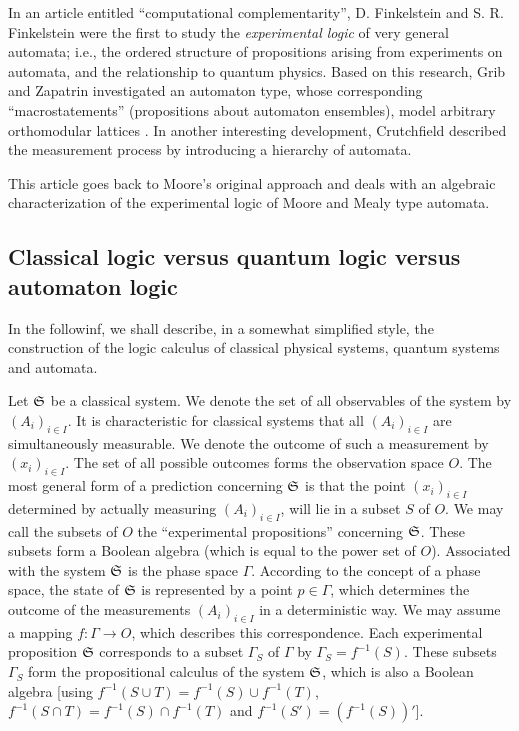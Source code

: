 In an article entitled ``computational complementarity'',
D. Finkelstein and S. R. Finkelstein \cite{finkelstein} were the first
to study the {\em experimental logic} of very general
automata; i.e., the ordered structure of propositions
arising from experiments on automata, and the relationship to quantum
physics. Based on this research, Grib and Zapatrin \cite{grib90,grib92}
investigated an
automaton type, whose corresponding ``macrostatements'' (propositions
about automaton ensembles),  model
arbitrary orthomodular lattices \cite{gsz}. In another interesting
development, Crutchfield
\cite{crutchfield}
described the measurement process by
introducing a hierarchy of automata.

This article goes back to Moore's original approach and deals with
an algebraic characterization of the experimental logic of Moore and
Mealy type automata.

\subsection{Classical logic versus quantum logic versus automaton logic}

In the followinf, we shall describe, in a somewhat simplified
style, the construction of the logic calculus
of classical physical systems, quantum systems and automata.

Let ${\frak S}$ be a classical system.
We denote the set of all observables of the system by
$(A_i)_{i \in I}$.
It is characteristic for classical systems that all $(A_i)_{i \in I}$ are
simultaneously measurable.
We denote the outcome of such a measurement by $(x_i)_{i \in I}$.
The set of all possible outcomes forms the observation space $O$.
The most general form of a prediction concerning ${\frak S}$ is that
the point $(x_i)_{i \in I}$ determined by actually measuring $(A_i)_{i \in I}$, will
lie in a subset $S$ of $O$.
We may call the subsets of $O$ the ``experimental propositions''
concerning ${\frak S}$.
These subsets form a Boolean algebra (which is equal to
the power set of $O$).
Associated with the system ${\frak S}$ is the phase space $\Gamma$.
According to the concept of a phase space, the state of ${\frak S}$
is represented by a point $p \in \Gamma$, which determines
the outcome of the measurements $(A_i)_{i \in I}$ in a deterministic way.
We may assume a mapping $f: \Gamma \rightarrow O$, which describes
this correspondence.
Each experimental proposition ${\frak S}$ corresponds to a subset
$\Gamma_S$ of $\Gamma$ by $\Gamma_S = f^{-1}(S)$.
These subsets $\Gamma_S$ form the propositional calculus of the system
${\frak S}$, which is also a Boolean algebra
[using $f^{-1}(S \cup T) = f^{-1}(S) \cup f^{-1}(T)$,
$f^{-1}(S \cap T) = f^{-1}(S) \cap f^{-1}(T)$ and
$f^{-1}(S') = (f^{-1}(S))'$].

